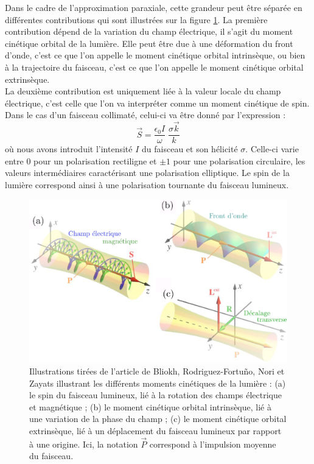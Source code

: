 \documentclass[a4paper,11pt]{article} %
\begin{document}
	Dans le cadre de l'approximation paraxiale, cette grandeur peut être séparée en différentes contributions qui sont illustrées sur la figure \ref{fig:moments_angulaires}. La première contribution dépend de la variation du champ électrique, il s'agit du moment cinétique orbital de la lumière. Elle peut être due à une déformation du front d'onde, c'est ce que l'on appelle le moment cinétique orbital intrinsèque, ou bien à la trajectoire du faisceau, c'est ce que l'on appelle le moment cinétique orbital extrinsèque.\\
	
	La deuxième contribution est uniquement liée à la valeur locale du champ électrique, c'est celle que l'on va interpréter comme un moment cinétique de spin. Dans le cas d'un faisceau collimaté, celui-ci va être donné par l'expression :
	\begin{equation*}
		\vec{S} = \frac{\epsilon_0 I}{\omega} \; \frac{\sigma \vec{k}}{k}
	\end{equation*}
	où nous avons introduit l'intensité $ I $ du faisceau et son hélicité $ \sigma $. Celle-ci varie entre 0 pour un polarisation rectiligne et $\pm 1 $ pour une polarisation circulaire, les valeurs intermédiaires caractérisant une polarisation elliptique. Le spin de la lumière correspond ainsi à une polarisation tournante du faisceau lumineux.
	
	\begin{figure}[h]
		\centering
		\begin{minipage}[c]{0.9\linewidth}
			\centering
			\includegraphics[width=0.8\linewidth]{./Illustrations/moments_angulaires}
			\caption{Illustrations tirées de l'article de Bliokh, Rodriguez-Fortuño, Nori et Zayats illustrant les différents moments cinétiques de la lumière : (a) le spin du faisceau lumineux, lié à la rotation des champs électrique et magnétique ; (b) le moment cinétique orbital intrinsèque, lié à une variation de la phase du champ ; (c) le moment cinétique orbital extrinsèque, lié à un déplacement du faisceau lumineux par rapport à une origine. Ici, la notation $ \vec{P} $ correspond à l'impulsion moyenne du faisceau.}
			\label{fig:moments_angulaires}
		\end{minipage}
	\end{figure}
	
\end{document}

